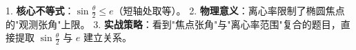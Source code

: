 \begin{summarybox}
1. \textbf{核心不等式}：$\sin \frac{\theta}{2} \le e$（短轴处取等）。
2. \textbf{物理意义}：离心率限制了椭圆焦点的"观测张角"上限。
3. \textbf{实战策略}：看到"焦点张角"与"离心率范围"复合的题目，直接提取 $\sin \frac{\theta}{2}$ 与 $e$ 建立关系。
\end{summarybox}